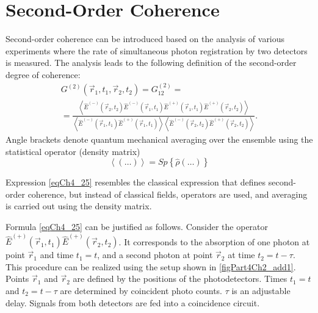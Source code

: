 \section{Second-Order Coherence}
Second-order coherence can be introduced based on the analysis of various experiments where the rate of simultaneous photon registration by two detectors is measured. The analysis leads to the following definition of the second-order degree of coherence:
\begin{eqnarray}
G^{(2)}\left(\vec{r}_1, t_1, \vec{r}_2, t_2\right) = 
G^{(2)}_{12} = 
\nonumber \\
=
\frac{\left<
\hat{E}^{(-)}\left(\vec{r}_2, t_2\right)
\hat{E}^{(-)}\left(\vec{r}_1, t_1\right)
\hat{E}^{(+)}\left(\vec{r}_1, t_1\right)
\hat{E}^{(+)}\left(\vec{r}_2, t_2\right)
\right>}
{\left<
\hat{E}^{(-)}\left(\vec{r}_1, t_1\right)
\hat{E}^{(+)}\left(\vec{r}_1, t_1\right)
\right>
\left<
\hat{E}^{(-)}\left(\vec{r}_2, t_2\right)
\hat{E}^{(+)}\left(\vec{r}_2, t_2\right)
\right>
}.
\label{eqCh4_25}
\end{eqnarray}
Angle brackets denote quantum mechanical averaging over the ensemble using the statistical operator (density matrix)
\[
\left<\left(\dots\right)\right> = Sp\left\{\hat{\rho}\left(\dots\right)\right\}
\]

Expression \eqref{eqCh4_25} resembles the classical expression that defines second-order coherence, but instead of classical fields, operators are used, and averaging is carried out using the density matrix.



Formula \eqref{eqCh4_25} can be justified as follows. Consider the operator 
$\hat{E}^{(+)}\left(\vec{r}_1, t_1\right)\hat{E}^{(+)}\left(\vec{r}_2, t_2\right)$. It corresponds to the absorption of one photon at point $\vec{r}_1$ and time $t_1 = t$, and a second photon at point $\vec{r}_2$ at time $t_2 = t - \tau$. This procedure can be realized using the setup shown in \autoref{figPart4Ch2_add1}. Points $\vec{r}_1$ and $\vec{r}_2$ are defined by the positions of the photodetectors. Times $t_1 = t$ and $t_2 = t - \tau$ are determined by coincident photo counts. $\tau$ is an adjustable delay. Signals from both detectors are fed into a coincidence circuit.

